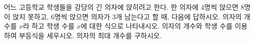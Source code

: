 어느 고등학교 학생들을 강당의 긴 의자에 앉히려고 한다. 한 의자에 $4$명씩 앉으면 $8$명이 앉지 못하고, $6$명씩 앉으면 의자가 $3$개 남는다고 할 때, 다음에 답하시오.
 의자의 개수를 $x$라 하고 학생 수를 $x$에 대한 식으로 나타내시오.
 의자의 개수와 학생 수를 이용하여 부등식을 세우시오.
 의자의 최대 개수를 구하시오.

